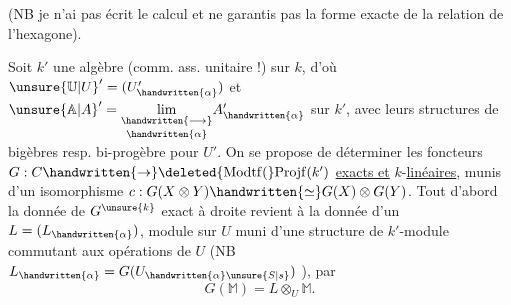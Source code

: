  (NB je n'ai pas écrit le calcul et ne garantis pas la forme exacte de la relation de l'hexagone).

Soit $k'$ une algèbre (comm. ass. unitaire !) sur $k$, d'où $\unsure{\mathbb{U}|U}'=(U'_{\handwritten{\alpha}})$ et $\unsure{\mathbb{A}|A}'=\underset{\handwritten{\alpha}}{\underset{\handwritten{\longrightarrow}}{\lim}}A'_{\handwritten{\alpha}}$ sur $k'$, avec leurs structures de bigèbres \handwritten{(}resp. bi-progèbre pour $U'$\handwritten{)}. On se propose de déterminer les foncteurs $G:C\handwritten{\to}\deleted{\mathrm{Modtf}(}\mathrm{Projf}(k')$ \uline{exacts et} $k$-\uline{linéaires}, munis d'un isomorphisme $c:G(X\otimes Y)\handwritten{\simeq}G(X)\otimes G(Y)$.  Tout d'abord la donnée de $G^{\unsure{k}}$ exact à droite revient à la donnée d'un $L=(L_{\handwritten{\alpha}})$, module sur $U$\handwritten{,} muni d'une structure de $k'$-module  commutant aux opérations de $U$ (NB $L_{\handwritten{\alpha}}=G(U_{\handwritten{\alpha}\unsure{S|s}})$ ), par
\[
G(\mathbb{M})=L\otimes_U\mathbb{M}.
\]

